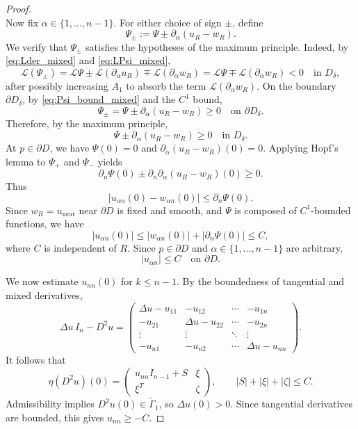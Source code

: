 \documentclass[reqno,a4paper]{amsart}
\numberwithin{equation}{section}
\begin{document}
\begin{proof}
\begin{equation}
		\end{equation}
		Now fix $\alpha\in\{1,\dots,n-1\}$. For either choice of sign $\pm$, define
		\[
		\Psi_\pm := \Psi \pm \partial_\alpha(u_R-w_R).
		\]
		We verify that $\Psi_\pm$ satisfies the hypotheses of the maximum principle.
		Indeed, by \eqref{eq:Lder_mixed} and \eqref{eq:LPsi_mixed},
		\[
		\mathcal{L}(\Psi_\pm)
		= \mathcal{L}\Psi \pm \mathcal{L}(\partial_\alpha u_R) \mp \mathcal{L}(\partial_\alpha w_R)
		= \mathcal{L}\Psi \mp \mathcal{L}(\partial_\alpha w_R) < 0 \quad \text{in } D_\delta,
		\]
		after possibly increasing $A_1$ to absorb the term $\mathcal{L}(\partial_\alpha w_R)$.
		On the boundary $\partial D_\delta$, by \eqref{eq:Psi_bound_mixed} and the $C^1$ bound,
		\[
		\Psi_\pm = \Psi \pm \partial_\alpha(u_R-w_R) \ge 0 \quad \text{on } \partial D_\delta.
		\]
		Therefore, by the maximum principle,
		\begin{equation}
			\Psi \pm \partial_\alpha(u_R-w_R) \ge 0 \quad \text{in } D_\delta. \label{eq:Psi_alpha_bound_mixed}
		\end{equation}
		At $p\in\partial D$, we have $\Psi(0)=0$ and $\partial_\alpha(u_R-w_R)(0)=0$. 
		Applying Hopf's lemma to $\Psi_+$ and $\Psi_-$ yields
		\[
		\partial_n\Psi(0) \pm \partial_n\partial_\alpha(u_R-w_R)(0) \ge 0.
		\]
		Thus
		\[
		|u_{\alpha n}(0) - w_{\alpha n}(0)| \le \partial_n\Psi(0).
		\]
		Since $w_R=u_{\mathrm{near}}$ near $\partial D$ is fixed and smooth, and $\Psi$ is composed of $C^1$-bounded functions, we have
		\[
		|u_{\alpha n}(0)| \le |w_{\alpha n}(0)| + |\partial_n\Psi(0)| \le C,
		\]
		where $C$ is independent of $R$. Since $p\in\partial D$ and $\alpha\in\{1,\dots,n-1\}$ are arbitrary,
		\begin{equation}
			|u_{\alpha n}| \le C \quad \text{on } \partial D. \label{eq:mixed_mixed}
		\end{equation}
		
		
		
		
		We now estimate $u_{nn}(0)$ for $k\leq n-1$. By the boundedness of tangential and mixed derivatives,
		\[
		\Delta u \, I_n - D^2u = 
		\begin{pmatrix}
			\Delta u - u_{11} & -u_{12} & \cdots & -u_{1n} \\
			-u_{21} & \Delta u - u_{22} & \cdots & -u_{2n} \\
			\vdots & \vdots & \ddots & \vdots \\
			-u_{n1} & -u_{n2} & \cdots & \Delta u - u_{nn}
		\end{pmatrix}.
		\]
		It follows that 
		\[
		\eta(D^2 u)(0) = \begin{pmatrix}
			u_{nn} I_{n-1} + S & \xi \\
			\xi^T & \zeta
		\end{pmatrix},
		\qquad |S| + |\xi| + |\zeta| \le C.
		\]
		Admissibility implies $D^2 u(0) \in \widetilde{\Gamma}_1$, so $\Delta u(0) > 0$. Since tangential derivatives are bounded, this gives $u_{nn} \ge -C$.
		

\end{proof}
\end{document}
